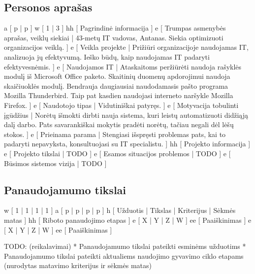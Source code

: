 ﻿\subsection{Personos aprašas}
\xtableu
{
  a [ p | p ]
  w [ 1 | 3 ]
  hh [ Pagrindinė informacija ]
  e [ Trumpas asmenybės aprašas, veiklų siekiai 
  | 
    43-metų IT vadovas, Antanas. Siekia optimizuoti organizacijos veiklą.
  ]
  e [ Veikla projekte 
  | 
    Prižiūri organizacijoje naudojamas IT, analizuoja jų efektyvumą. Ieško būdų, kaip naudojamas IT padaryti efektyvesnėmis.
  ]
  e [ Naudojamos IT 
  | 
    Ataskaitoms peržiūrėti naudoja rašyklės modulį iš Microsoft Office paketo. Skaitinių duomenų apdorojimui naudoja skaičiuoklės modulį. Bendrauja daugiausiai naudodamasis pašto programa Mozilla Thunderbird. Taip pat kasdien naudojasi interneto naršykle Mozilla Firefox.
  ]
  e [ Naudotojo tipas 
  | 
    Vidutiniškai patyręs. 
  ]
  e [ Motyvacija tobulinti įgūdžius 
  |
    Norėtų išmokti dirbti nauja sistema, kuri leistų automatizuoti didžiąją dalį darbo. Pats savarankiškai mokytis pradėti norėtų, tačiau negali dėl lėšų stokos.
  ]
  e [ Prieinama parama 
  | 
    Stengiasi išspręsti problemas pats, kai to padaryti nepavyksta, konsultuojasi su IT specialistu.
  ]
  hh [ Projekto informacija ]
  e [ Projekto tikslai 
  | 
    TODO 
  ]
  e [ Esamos situacijos problemos 
  | 
    TODO 
  ]
  e [ Būsimos sistemos vizija 
  | 
    TODO  
  ]
}

\subsection{Panaudojamumo tikslai}
\xtable
{
  w [ 1 | 1 | 1 | 1 ]
  a [ p | p | p | p ]
  h [ Užduotis | Tikslas | Kriterijus | Sėkmės matas ]
  hh [ Riboto panaudojimo etapas ]
  e [ X | Y | Z | W ]
  ee [ Paaiškinimas ]
  e [ X | Y | Z | W ]
  ee [ Paaiškinimas ]
}

TODO: (reikalavimai)
* Panaudojamumo tikslai pateikti esminėms užduotims
* Panaudojamumo tikslai pateikti aktualiems naudojimo gyvavimo ciklo etapams (nurodytas matavimo kriterijus ir sėkmės matas)
